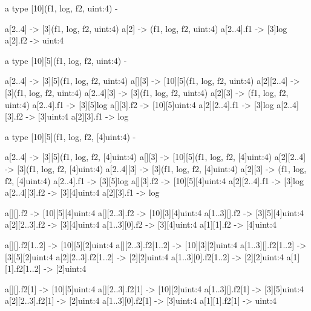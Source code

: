 \documentclass[10pt,a4paper,twoside,fleqn]{book}
\begin{document}
    \begin{verbatimtab}
    a type [10](f1, log, f2, uint:4) -
    \end{verbatimtab}

    \begin{verbatimtab}
        a[2..4]     -> [3](f1, log, f2, uint:4)
        a[2]        -> (f1, log, f2, uint:4)
        a[2..4].f1  -> [3]log
        a[2].f2     -> uint:4
    \end{verbatimtab}

    \begin{verbatimtab}
    a type [10][5](f1, log, f2, uint:4) -
    \end{verbatimtab}

    \begin{verbatimtab}
        a[2..4]         ->  [3][5](f1, log, f2, uint:4)
        a[][3]          ->  [10][5](f1, log, f2, uint:4)
        a[2][2..4]      ->  [3](f1, log, f2, uint:4)
        a[2..4][3]      ->  [3](f1, log, f2, uint:4)
        a[2][3]         ->  (f1, log, f2, uint:4)
        a[2..4].f1      ->  [3][5]log
        a[][3].f2       ->  [10][5]uint:4
        a[2][2..4].f1   ->  [3]log
        a[2..4][3].f2   ->  [3]uint:4
        a[2][3].f1      ->  log
    \end{verbatimtab}

    \begin{verbatimtab}
    a type [10][5](f1, log, f2, [4]uint:4) -
    \end{verbatimtab}

    \begin{verbatimtab}
        a[2..4]         ->  [3][5](f1, log, f2, [4]uint:4)
        a[][3]          ->  [10][5](f1, log, f2, [4]uint:4)
        a[2][2..4]      ->  [3](f1, log, f2, [4]uint:4)
        a[2..4][3]      ->  [3](f1, log, f2, [4]uint:4)
        a[2][3]         ->  (f1, log, f2, [4]uint:4)
        a[2..4].f1      ->  [3][5]log
        a[][3].f2       ->  [10][5][4]uint:4
        a[2][2..4].f1   ->  [3]log
        a[2..4][3].f2   ->  [3][4]uint:4
        a[2][3].f1      ->  log

        a[][].f2        ->  [10][5][4]uint:4
        a[][2..3].f2    ->  [10][3][4]uint:4
        a[1..3][].f2    ->  [3][5][4]uint:4
        a[2][2..3].f2   ->  [3][4]uint:4
        a[1..3][0].f2   ->  [3][4]uint:4
        a[1][1].f2      ->  [4]uint:4

        a[][].f2[1..2]      ->  [10][5][2]uint:4
        a[][2..3].f2[1..2]  ->  [10][3][2]uint:4
        a[1..3][].f2[1..2]  ->  [3][5][2]uint:4
        a[2][2..3].f2[1..2] ->  [2][2]uint:4
        a[1..3][0].f2[1..2] ->  [2][2]uint:4
        a[1][1].f2[1..2]    ->  [2]uint:4

        a[][].f2[1]         ->  [10][5]uint:4
        a[][2..3].f2[1]     ->  [10][2]uint:4
        a[1..3][].f2[1]     ->  [3][5]uint:4
        a[2][2..3].f2[1]    ->  [2]uint:4
        a[1..3][0].f2[1]    ->  [3]uint:4
        a[1][1].f2[1]       ->  uint:4
    \end{verbatimtab}
\end{document}
